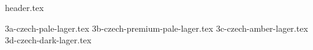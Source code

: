 \clearpage
{}
\divisorLine

{header.tex}

\begin{multicols}{2}

{3a-czech-pale-lager.tex}
{3b-czech-premium-pale-lager.tex}
{3c-czech-amber-lager.tex}
{3d-czech-dark-lager.tex}

\end{multicols}
